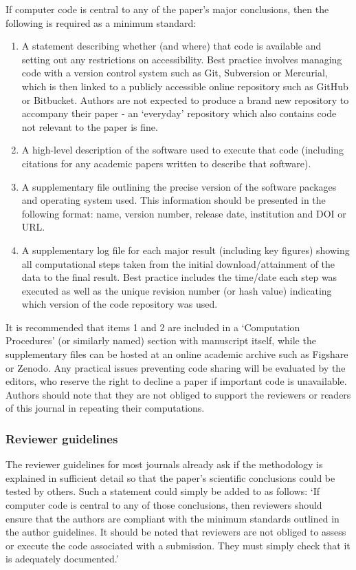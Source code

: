 If computer code is central to any of the paper's major conclusions, then the following is required as a minimum standard: 
\begin{enumerate}
\item A statement describing whether (and where) that code is available and setting out any restrictions on accessibility. Best practice involves managing code with a version control system such as Git, Subversion or Mercurial, which is then linked to a publicly accessible online repository such as GitHub or Bitbucket. Authors are not expected to produce a brand new repository to accompany their paper - an `everyday' repository which also contains code not relevant to the paper is fine.  
\item A high-level description of the software used to execute that code (including citations for any academic papers written to describe that software).
\item A supplementary file outlining the precise version of the software packages and operating system used. This information should be presented in the following format: name, version number, release date, institution and DOI or URL.
\item A supplementary log file for each major result (including key figures) showing all computational steps taken from the initial download/attainment of the data to the final result. Best practice includes the time/date each step was executed as well as the unique revision number (or hash value) indicating which version of the code repository was used. 
\end{enumerate}

It is recommended that items 1 and 2 are included in a `Computation Procedures' (or similarly named) section with manuscript itself, while the supplementary files can be hosted at an online academic archive such as Figshare or Zenodo. Any practical issues preventing code sharing will be evaluated by the editors, who reserve the right to decline a paper if important code is unavailable. Authors should note that they are not obliged to support the reviewers or readers of this journal in repeating their computations.

\subsubsection{Reviewer guidelines}

The reviewer guidelines for most journals already ask if the methodology is explained in sufficient detail so that the paper's scientific conclusions could be tested by others. Such a statement could simply be added to as follows: `If computer code is central to any of those conclusions, then reviewers should ensure that the authors are compliant with the minimum standards outlined in the author guidelines. It should be noted that reviewers are not obliged to assess or execute the code associated with a submission. They must simply check that it is adequately documented.'   
  
 
    
  
  
